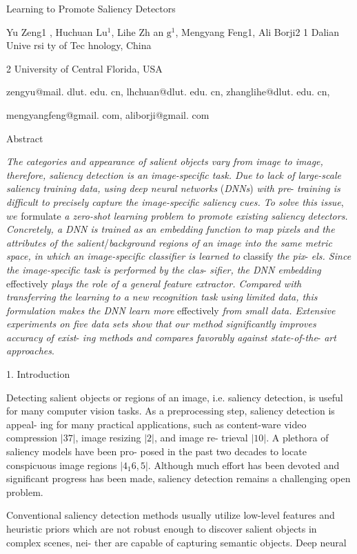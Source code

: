 \documentclass[a4paper,10pt]{article}
\begin{document}
Learning to Promote Saliency Detectors

Yu Zeng1 , Huchuan $\mathrm{L}\mathrm{u}^{1}$, Lihe Zh an $\mathrm{g}^{1}$, Mengyang Feng1, Ali Borji2 1 Dalian Unive rsi ty of Tec hnology, China

2 University of Central Florida, USA

zengyu@mail. dlut. edu. cn, lhchuan@dlut. edu. cn, zhanglihe@dlut. edu. cn,

mengyangfeng@gmail. com, aliborji@gmail. com

Abstract

{\it The categories and appearance of salient objects vary from image to image, therefore, saliency detection is an image-specific task. Due to lack of large-scale saliency training data, using deep neural networks} ({\it DNNs}) {\it with pre}- {\it training is difficult to precisely capture the image-specific saliency cues. To solve this issue}, $we$ formulate {\it a zero-shot learning problem to promote existing saliency detectors. Concretely, a DNN is trained as an embedding function to map pixels and the attributes of the salient}/{\it background regions of an image into the same metric space, in which an image-specific classifier is learned to} classify {\it the pix}- {\it els. Since the image-specific task is performed by the clas}- {\it sifier, the DNN embedding} effectively {\it plays the role of a general feature extractor. Compared with transferring the learning to a new recognition task using limited data, this formulation makes the DNN learn more} effectively {\it from small data. Extensive experiments on five data sets show that our method significantly improves accuracy of exist}- {\it ing methods and compares favorably against state-of-the}- {\it art approaches}.

1. Introduction

Detecting salient objects or regions of an image, i.e. saliency detection, is useful for many computer vision tasks. As a preprocessing step, saliency detection is appeal- ing for many practical applications, such as content-ware video compression $|37|$, image resizing $|2|$, and image re- trieval $|10|$. A plethora of saliency models have been pro- posed in the past two decades to locate conspicuous image regions $|4_{1}6, 5|$. Although much effort has been devoted and significant progress has been made, saliency detection remains a challenging open problem.

Conventional saliency detection methods usually utilize low-level features and heuristic priors which are not robust enough to discover salient objects in complex scenes, nei- ther are capable of capturing semantic objects. Deep neural
\end{document}
